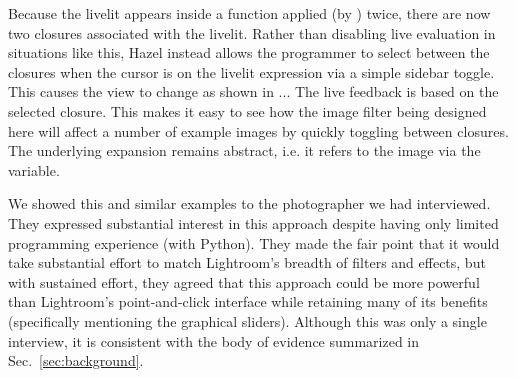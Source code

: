 Because the livelit appears inside a function applied (by ) twice, 
there are now two closures associated with the livelit. 
Rather than disabling live evaluation in situations like 
this, Hazel instead allows the programmer to select between the closures when 
the cursor is on the livelit expression via a simple sidebar toggle. 
This causes the view to change as shown in ...
The live feedback is based on the selected closure.
This makes it easy to see how the image filter being designed here will affect a
number of example images by quickly toggling between closures. 
The underlying expansion remains abstract, i.e. it refers to the image via the  variable.

We showed this and similar examples to the photographer we had interviewed. 
They expressed substantial interest in this approach despite having only 
limited programming experience (with Python). They made the fair point that it 
would take substantial effort to match Lightroom's breadth of filters and effects, 
but with sustained effort, they agreed that this approach could be more powerful than 
Lightroom's point-and-click interface while retaining many of its benefits (specifically
mentioning the graphical sliders). Although this was only a single interview,
it is consistent with the body of evidence summarized in Sec.~\ref{sec:background}.


